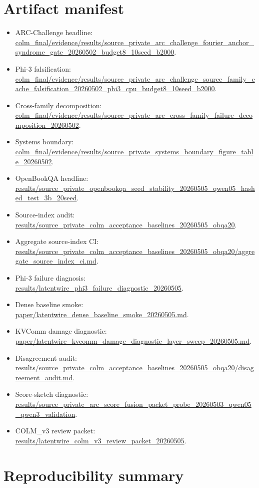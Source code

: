 \documentclass{article}
\newcommand{\arc}{ARC-Challenge}
\newcommand{\obqa}{OpenBookQA}
\begin{document}
\section{Artifact manifest}

\begin{itemize}
\item \arc{} headline: \url{colm_final/evidence/results/source_private_arc_challenge_fourier_anchor_syndrome_gate_20260502_budget8_10seed_b2000}.
\item Phi-3 falsification: \url{colm_final/evidence/results/source_private_arc_challenge_source_family_cache_falsification_20260502_phi3_cpu_budget8_10seed_b2000}.
\item Cross-family decomposition: \url{colm_final/evidence/results/source_private_arc_cross_family_failure_decomposition_20260502}.
\item Systems boundary: \url{colm_final/evidence/results/source_private_systems_boundary_figure_table_20260502}.
\item \obqa{} headline: \url{results/source_private_openbookqa_seed_stability_20260505_qwen05_hashed_test_3b_20seed}.
\item Source-index audit: \url{results/source_private_colm_acceptance_baselines_20260505_obqa20}.
\item Aggregate source-index CI: \url{results/source_private_colm_acceptance_baselines_20260505_obqa20/aggregate_source_index_ci.md}.
\item Phi-3 failure diagnosis: \url{results/latentwire_phi3_failure_diagnostic_20260505}.
\item Dense baseline smoke: \url{paper/latentwire_dense_baseline_smoke_20260505.md}.
\item KVComm damage diagnostic: \url{paper/latentwire_kvcomm_damage_diagnostic_layer_sweep_20260505.md}.
\item Disagreement audit: \url{results/source_private_colm_acceptance_baselines_20260505_obqa20/disagreement_audit.md}.
\item Score-sketch diagnostic: \url{results/source_private_arc_score_fusion_packet_probe_20260503_qwen05_qwen3_validation}.
\item COLM\_v3 review packet: \url{results/latentwire_colm_v3_review_packet_20260505}.
\end{itemize}

\section{Reproducibility summary}
\end{document}

